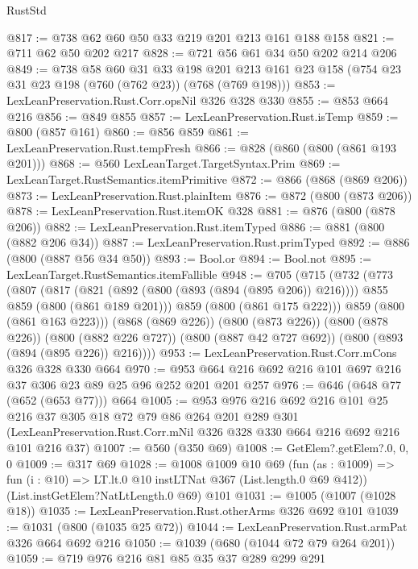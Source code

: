 \begin{lexlean}{RustStd}
\begin{coremodule}
{\begin{coremodule}
{{{{{@817 := @738 @62 @60 @50 @33 @219 @201 @213 @161 @188 @158
@821 := @711 @62 @50 @202 @217
@828 := @721 @56 @61 @34 @50 @202 @214 @206
@849 := @738
    @58
    @60
    @31
    @33
    @198
    @201
    @213
    @161
    @23
    @158
    (@754 @23 @31 @23 @198 (@760 (@762 @23)) (@768 (@769 @198)))
@853 := LexLeanPreservation.Rust.Corr.opsNil @326 @328 @330
@855 := @853 @664 @216
@856 := @849 @855
@857 := LexLeanPreservation.Rust.isTemp
@859 := @800 (@857 @161)
@860 := @856 @859
@861 := LexLeanPreservation.Rust.tempFresh
@866 := @828 (@860 (@800 (@861 @193 @201)))
@868 := @560 LexLeanTarget.TargetSyntax.Prim
@869 := LexLeanTarget.RustSemantics.itemPrimitive
@872 := @866 (@868 (@869 @206))
@873 := LexLeanPreservation.Rust.plainItem
@876 := @872 (@800 (@873 @206))
@878 := LexLeanPreservation.Rust.itemOK @328
@881 := @876 (@800 (@878 @206))
@882 := LexLeanPreservation.Rust.itemTyped
@886 := @881 (@800 (@882 @206 @34))
@887 := LexLeanPreservation.Rust.primTyped
@892 := @886 (@800 (@887 @56 @34 @50))
@893 := Bool.or
@894 := Bool.not
@895 := LexLeanTarget.RustSemantics.itemFallible
@948 := @705
    (@715
      (@732
        (@773
          (@807
            (@817
              (@821 (@892 (@800 (@893 (@894 (@895 @206)) @216))))
              @855
              @859
              (@800 (@861 @189 @201)))
            @859
            (@800 (@861 @175 @222)))
          @859
          (@800 (@861 @163 @223)))
        (@868 (@869 @226))
        (@800 (@873 @226))
        (@800 (@878 @226))
        (@800 (@882 @226 @727))
        (@800 (@887 @42 @727 @692))
        (@800 (@893 (@894 (@895 @226)) @216))))
@953 := LexLeanPreservation.Rust.Corr.mCons @326 @328 @330 @664
@970 := @953 @664 @216 @692 @216 @101 @697 @216 @37 @306 @23 @89 @25 @96 @252 @201 @201 @257
@976 := @646 (@648 @77 (@652 (@653 @77))) @664
@1005 := @953
    @976
    @216
    @692
    @216
    @101
    @25
    @216
    @37
    @305
    @18
    @72
    @79
    @86
    @264
    @201
    @289
    @301
    (LexLeanPreservation.Rust.Corr.mNil @326 @328 @330 @664 @216 @692 @216 @101 @216 @37)
@1007 := @560 (@350 @69)
@1008 := GetElem?.getElem?.{0, 0, 0}
@1009 := @317 @69
@1028 := @1008
    @1009
    @10
    @69
    (fun (as : @1009) => fun (i : @10) => LT.lt.{0} @10 instLTNat @367 (List.length.{0} @69 @412))
    (List.instGetElem?NatLtLength.{0} @69)
    @101
@1031 := @1005 (@1007 (@1028 @18))
@1035 := LexLeanPreservation.Rust.otherArms @326 @692 @101
@1039 := @1031 (@800 (@1035 @25 @72))
@1044 := LexLeanPreservation.Rust.armPat @326 @664 @692 @216
@1050 := @1039 (@680 (@1044 @72 @79 @264 @201))
@1059 := @719 @976 @216 @81 @85 @35 @37 @289 @299 @291
}}}}}
\end{coremodule}}
\end{coremodule}
\end{lexlean}
